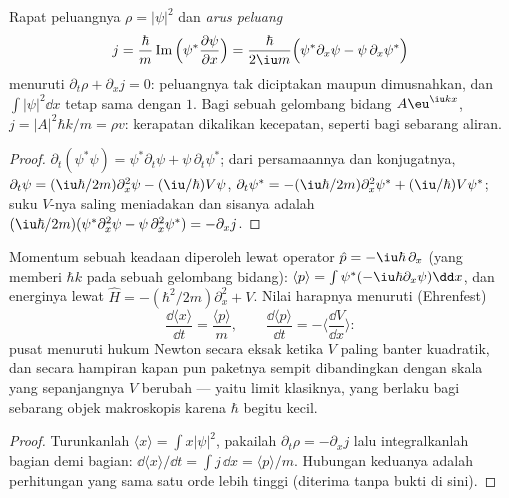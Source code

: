 \begin{proposition}\label{prop:b2:schrodinger-wave-functions:current}
Rapat peluangnya $\rho = |\psi|^2$ dan \emph{arus
peluang}
\[
j = \frac{\hbar}{m}\operatorname{Im}\Big(\psi^*\frac{\partial\psi}{\partial x}\Big)
= \frac{\hbar}{2\iu m}\Big(\psi^*\partial_x\psi - \psi\,\partial_x\psi^*\Big)
\]
menuruti $\partial_t\rho + \partial_xj = 0$: peluangnya tak diciptakan maupun
dimusnahkan, dan $\int|\psi|^2\dd x$ tetap sama dengan $1$. Bagi sebuah gelombang bidang
$A\eu^{\iu kx}$, $j = |A|^2\hbar k/m = \rho v$: kerapatan dikalikan kecepatan, seperti bagi
sebarang aliran.
\end{proposition}

\begin{proof}
$\partial_t(\psi^*\psi) = \psi^*\partial_t\psi + \psi\,\partial_t\psi^*$; dari
persamaannya dan konjugatnya, $\partial_t\psi = (\iu\hbar/2m)\partial_x^2\psi -
(\iu/\hbar)V\psi$, $\partial_t\psi^* = -(\iu\hbar/2m)\partial_x^2\psi^* +
(\iu/\hbar)V\psi^*$; suku $V$-nya saling meniadakan dan sisanya adalah $(\iu\hbar/2m)(\psi^*
\partial_x^2\psi - \psi\,\partial_x^2\psi^*) = -\partial_xj$.
\end{proof}

\begin{proposition}\label{prop:b2:schrodinger-wave-functions:ehrenfest}
Momentum sebuah keadaan diperoleh lewat operator $\hat p =
-\iu\hbar\,\partial_x$ (yang memberi $\hbar k$ pada sebuah gelombang bidang): $\langle
p\rangle = \int\psi^*(-\iu\hbar\partial_x\psi)\dd x$, dan energinya lewat $\hat H
= -(\hbar^2/2m)\partial_x^2 + V$. Nilai harapnya menuruti
(Ehrenfest)
\[
\frac{\dd\langle x\rangle}{\dd t} = \frac{\langle p\rangle}{m}, \qquad
\frac{\dd\langle p\rangle}{\dd t} = -\Big\langle\frac{\dd V}{\dd x}\Big\rangle :
\]
pusat  menuruti hukum Newton secara eksak ketika $V$
paling banter kuadratik, dan secara hampiran kapan pun paketnya sempit
dibandingkan dengan skala yang sepanjangnya $V$ berubah --- yaitu limit klasiknya,
yang berlaku bagi sebarang objek makroskopis karena $\hbar$ begitu kecil.
\end{proposition}

\begin{proof}
Turunkanlah $\langle x\rangle = \int x|\psi|^2$, pakailah $\partial_t\rho =
-\partial_xj$ lalu integralkanlah bagian demi bagian: $\dd\langle x\rangle/\dd t = \int j\,\dd x
= \langle p\rangle/m$. Hubungan keduanya adalah perhitungan yang sama satu
orde lebih tinggi (diterima tanpa bukti di sini).
\end{proof}


